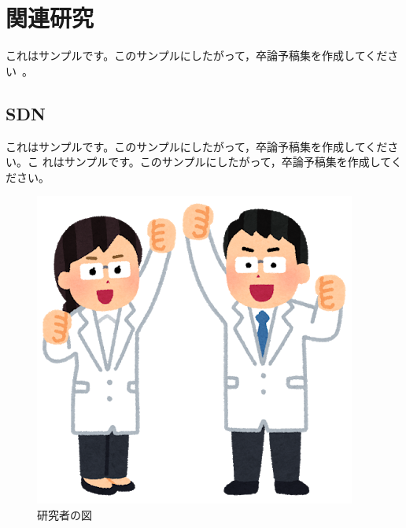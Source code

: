 \documentclass[a4paper,11pt]{jsarticle}
\begin{document}
\maketitle



 \section{関連研究}

  これはサンプルです。このサンプルにしたがって，卒論予稿集を作成してくださ
  い~\cite{sato19hoge-TPT}。
	
 \subsection{SDN}
 
 これはサンプルです。このサンプルにしたがって，卒論予稿集を作成してください。こ
 れはサンプルです。このサンプルにしたがって，卒論予稿集を作成してください。

	\begin{figure}[htb]
	 \centering
	 \includegraphics[width=\columnwidth]{figure1.png}
	 \caption{研究者の図}
	 \label{fig:investigator}
	\end{figure}

	
	
\end{document}
